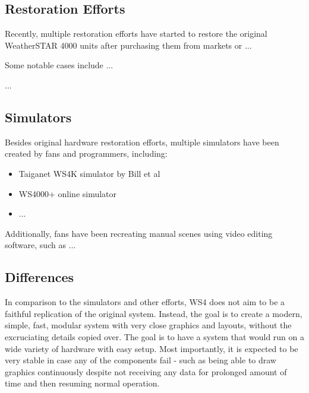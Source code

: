 \documentclass[a4paper,11pt]{refart}
\begin{document}
\subsection{Restoration Efforts}

Recently, multiple restoration efforts have started to restore the original WeatherSTAR 4000 units after purchasing them from markets or ...

Some notable cases include ...

...

\subsection{Simulators}

Besides original hardware restoration efforts, multiple simulators have been created by fans and programmers, including:

\begin{itemize}
	\item Taiganet WS4K simulator by Bill et al
	\item WS4000+ online simulator
	\item ...
\end{itemize}

Additionally, fans have been recreating manual scenes using video editing software, such as ...

\subsection{Differences}

In comparison to the simulators and other efforts, WS4 does not aim to be a faithful replication of the original system. Instead, the goal is to create a modern, simple, fast, modular system with very close graphics and layouts, without the excruciating details copied over. The goal is to have a system that would run on a wide variety of hardware with easy setup. Most importantly, it is expected to be very stable in case any of the components fail - such as being able to draw graphics continuously despite not receiving any data for prolonged amount of time and then resuming normal operation.


%
\end{document}

